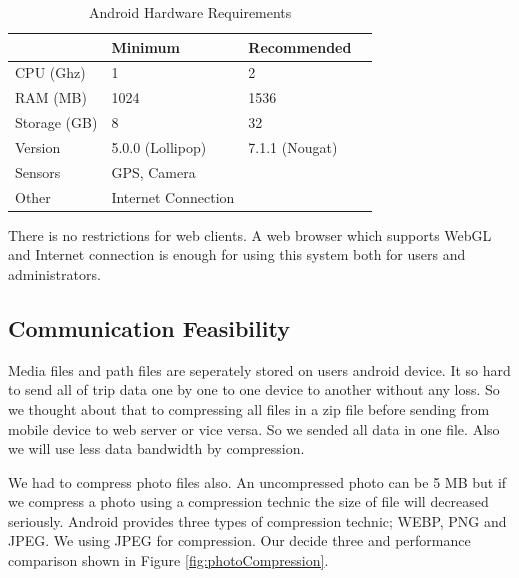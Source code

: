 \begin{table}[!ht]
\centering
\caption{Android Hardware Requirements}
\label{androidhardware}
\begin{tabular}{|l|l|l|l|}
\hline
            & \textbf{Minimum}    & \textbf{Recommended} \\\hline
CPU (Ghz) & \hfill 1      & \hfill 2     \\\hline
RAM (MB)      & \hfill 1024       & \hfill 1536        \\\hline
Storage (GB)   & \hfill 8     & \hfill 32       \\\hline
Version  & \hfill 5.0.0 (Lollipop)   & \hfill 7.1.1 (Nougat)      \\\hline
Sensors & GPS, Camera &  \\ \hline
Other & Internet Connection & \\ \hline
\end{tabular}
\end{table}

There is no restrictions for web clients. A web browser which supports WebGL and Internet connection is enough for using this system both for users and administrators.

\newpage
\subsection{Communication Feasibility}

Media files and path files are seperately stored on users android device. It so hard to send all of trip data one by one to one device to another without any loss. So we thought about that to compressing all files in a zip file before sending from mobile device to web server or vice versa. So we sended all data in one file. Also we will use less data bandwidth by compression. 

We had to compress photo files also. An uncompressed photo can be 5 MB but if we compress a photo using a compression technic the size of file will decreased seriously. Android provides three types of compression technic; WEBP, PNG and JPEG. We using JPEG for compression. Our decide three and performance comparison shown in Figure \ref{fig:photoCompression}.

